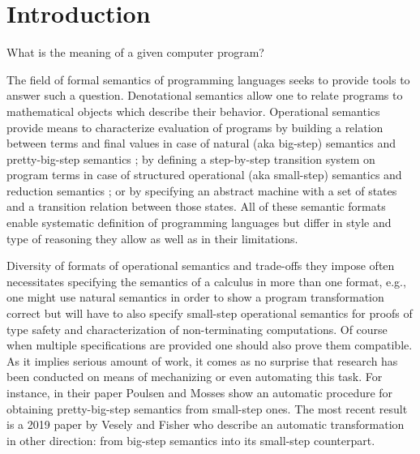 \chapter{Introduction}\label{chapter:introduction}
What is the meaning of a given computer program?

The field of formal semantics of programming languages seeks to provide tools to answer such a question.
Denotational semantics \cite{scott-denotational-semantics} allow one to relate programs to mathematical objects which describe their behavior.
Operational semantics provide means to characterize evaluation of programs by building a relation between terms and final values in case of natural (aka big-step) semantics \cite{kahn-natural-semantics} and pretty-big-step semantics \cite{pretty-big-step-semantics}; by defining a step-by-step transition system on program terms in case of structured operational (aka small-step) semantics \cite{plotkin-sos} and reduction semantics \cite{felleisen-reduction-semantics};
 or by specifying an abstract machine with a set of states and a transition relation between those states.
All of these semantic formats enable systematic definition of programming languages but differ in style and type of reasoning they allow as well as in their limitations. 

Diversity of formats of operational semantics and trade-offs they impose often necessitates specifying the semantics of a calculus in more than one format, e.g., one might use natural semantics in order to show a program transformation correct but will have to also specify small-step operational semantics for proofs of type safety and characterization of non-terminating computations.
Of course when multiple specifications are provided one should also prove them compatible.
As it implies serious amount of work, it comes as no surprise that research has been conducted on means of mechanizing or even automating this task.
For instance, in their paper \cite{poulsen-deriving-pretty-big-step} Poulsen and Mosses show an automatic procedure for obtaining pretty-big-step semantics from small-step ones.
The most recent result is a 2019 paper by Vesely and Fisher \cite{one-step-at-a-time} who describe an automatic transformation in other direction: from big-step semantics into its small-step counterpart.

